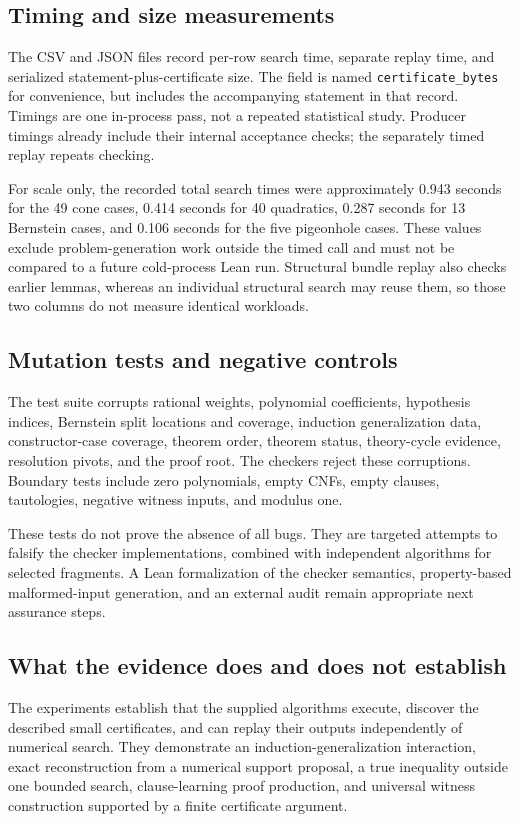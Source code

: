 \documentclass[11pt,letterpaper]{article}
\newcommand{\code}[1]{\texttt{#1}}
\theoremstyle{definition}\newtheorem{definition}[theorem]{Definition}
\theoremstyle{remark}\newtheorem{remark}[theorem]{Remark}
\begin{document}
\subsection{Timing and size measurements}
The CSV and JSON files record per-row search time, separate replay time, and serialized statement-plus-certificate size. The field is named \code{certificate\_bytes} for convenience, but includes the accompanying statement in that record. Timings are one in-process pass, not a repeated statistical study. Producer timings already include their internal acceptance checks; the separately timed replay repeats checking.

For scale only, the recorded total search times were approximately 0.943 seconds for the 49 cone cases, 0.414 seconds for 40 quadratics, 0.287 seconds for 13 Bernstein cases, and 0.106 seconds for the five pigeonhole cases. These values exclude problem-generation work outside the timed call and must not be compared to a future cold-process Lean run. Structural bundle replay also checks earlier lemmas, whereas an individual structural search may reuse them, so those two columns do not measure identical workloads.

\subsection{Mutation tests and negative controls}
The test suite corrupts rational weights, polynomial coefficients, hypothesis indices, Bernstein split locations and coverage, induction generalization data, constructor-case coverage, theorem order, theorem status, theory-cycle evidence, resolution pivots, and the proof root. The checkers reject these corruptions. Boundary tests include zero polynomials, empty CNFs, empty clauses, tautologies, negative witness inputs, and modulus one.

These tests do not prove the absence of all bugs. They are targeted attempts to falsify the checker implementations, combined with independent algorithms for selected fragments. A Lean formalization of the checker semantics, property-based malformed-input generation, and an external audit remain appropriate next assurance steps.

\subsection{What the evidence does and does not establish}
The experiments establish that the supplied algorithms execute, discover the described small certificates, and can replay their outputs independently of numerical search. They demonstrate an induction-generalization interaction, exact reconstruction from a numerical support proposal, a true inequality outside one bounded search, clause-learning proof production, and universal witness construction supported by a finite certificate argument.
\end{document}
